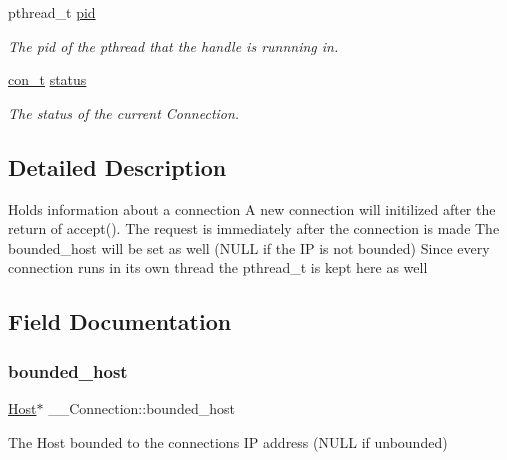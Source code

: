 \begin{DoxyCompactItemize}
pthread\+\_\+t \mbox{\hyperlink{struct_____connection_a14f7aa2d4815a0292b0e0579ea3ffec3}{pid}}
\begin{DoxyCompactList}\small\item\em The pid of the pthread that the handle is runnning in. \end{DoxyCompactList}\item 
\mbox{\hyperlink{server_8h_adff1af7110b02fbef1d43e5a4b638ee8}{con\+\_\+t}} \mbox{\hyperlink{struct_____connection_ab68ce7496aed662e1431a1c29d7c2a10}{status}}
\begin{DoxyCompactList}\small\item\em The status of the current Connection. \end{DoxyCompactList}\end{DoxyCompactItemize}


\subsection{Detailed Description}
Holds information about a connection A new connection will initilized after the return of accept(). The request is immediately after the connection is made The bounded\+\_\+host will be set as well (N\+U\+LL if the IP is not bounded) Since every connection runs in its own thread the pthread\+\_\+t is kept here as well 

\subsection{Field Documentation}
\mbox{\label{struct_____connection_a141d30c3e0a43c1a460797bfd4e4d581}} 
\subsubsection{\texorpdfstring{bounded\+\_\+host}{bounded\_host}}
{\footnotesize\ttfamily \mbox{\hyperlink{host_8h_a30ca67c0ed1f344be0c570271ecfc489}{Host}}$\ast$ \+\_\+\+\_\+\+Connection\+::bounded\+\_\+host}



The Host bounded to the connections IP address (N\+U\+LL if unbounded) 

\mbox{\label{struct_____connection_a49433c1edd3dd2f86a724047f9de2414}} 
